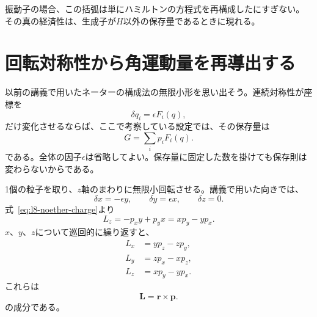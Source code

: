 \begin{classroomqa}
\end{classroomqa}

振動子の場合、この括弧は単にハミルトンの方程式を再構成したにすぎない。その真の経済性は、生成子が\(H\)以外の保存量であるときに現れる。

\section{回転対称性から角運動量を再導出する}

以前の講義で用いたネーターの構成法の無限小形を思い出そう。連続対称性が座標を
\begin{equation}
  \delta q_i=\epsilon F_i(q),
  \label{eq:l8-noether-variation}
\end{equation}
だけ変化させるならば、ここで考察している設定では、その保存量は
\begin{equation}
  G=\sum_i p_iF_i(q).
  \label{eq:l8-noether-charge}
\end{equation}
である。全体の因子\(\epsilon\)は省略してよい。保存量に固定した数を掛けても保存則は変わらないからである。

1個の粒子を取り、\(z\)軸のまわりに無限小回転させる。講義で用いた向きでは、
\begin{equation}
  \delta x=-\epsilon y,\qquad
  \delta y=\epsilon x,\qquad
  \delta z=0.
  \label{eq:l8-z-rotation}
\end{equation}
式~\eqref{eq:l8-noether-charge}より
\begin{equation}
  L_z=-p_xy+p_yx=xp_y-yp_x.
  \label{eq:l8-lz}
\end{equation}
\(x\)、\(y\)、\(z\)について巡回的に繰り返すと、
\begin{equation}
  \boxed{\begin{aligned}
    L_x&=yp_z-zp_y,\\
    L_y&=zp_x-xp_z,\\
    L_z&=xp_y-yp_x.
  \end{aligned}}
  \label{eq:l8-angular-components}
\end{equation}
これらは
\begin{equation}
  \boldsymbol L=\boldsymbol r\times\boldsymbol p.
  \label{eq:l8-cross-product}
\end{equation}
の成分である。

